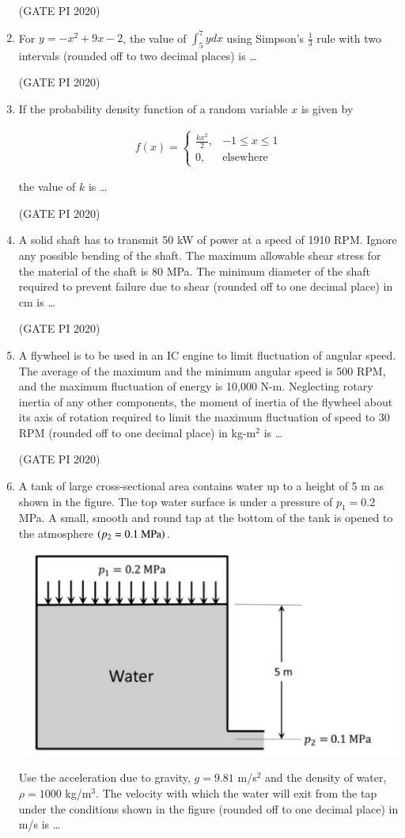 \documentclass[journal,12pt,onecolumn]{IEEEtran}
\theoremstyle{remark}
\begin{document}
\begin{enumerate}
\hfill (GATE PI 2020)

\item For $y = -x^2 + 9x - 2$, the value of $\int_5^7 ydx$ using Simpson's $\frac{1}{3}$ rule with two intervals (rounded off to two decimal places) is \dots

\hfill (GATE PI 2020)

\item If the probability density function of a random variable $x$ is given by

\begin{align*}
f(x) =
\begin{cases}
\frac{kx^2}{2}, & -1 \leq x \leq 1 \\
0, & \text{elsewhere}
\end{cases}
\end{align*}

the value of $k$ is \dots

\hfill (GATE PI 2020)

\item A solid shaft has to transmit 50 kW of power at a speed of 1910 RPM. Ignore any possible bending of the shaft. The maximum allowable shear stress for the material of the shaft is 80 MPa. The minimum diameter of the shaft required to prevent failure due to shear (rounded off to one decimal place) in cm is \dots

\hfill (GATE PI 2020)

\item A flywheel is to be used in an IC engine to limit fluctuation of angular speed. The average of the maximum and the minimum angular speed is 500 RPM, and the maximum fluctuation of energy is 10,000 N\--m. Neglecting rotary inertia of any other components, the moment of inertia of the flywheel about its axis of rotation required to limit the maximum fluctuation of speed to 30 RPM (rounded off to one decimal place) in kg\--m$^2$ is \dots

\hfill (GATE PI 2020)

\item A tank of large cross-sectional area contains water up to a height of 5 m as shown in the figure. The top water surface is under a pressure of $p_1 = 0.2$ MPa. A small, smooth and round tap at the bottom of the tank is opened to the atmosphere $\left(p_2 = 0.1\text{ MPa}\right)$.\
\begin{center}
\includegraphics[width=0.5\columnwidth]{figs/fig14.png}
\end{center}
Use the acceleration due to gravity, $g = 9.81$ m/s$^2$ and the density of water, $\rho = 1000$ kg/m$^3$. The velocity with which the water will exit from the tap under the conditions shown in the figure (rounded off to one decimal place) in m/s is \dots 


\end{enumerate}
\end{document}
